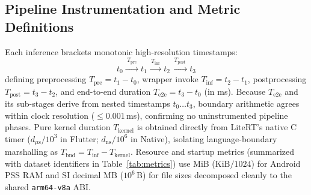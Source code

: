 \subsection{Pipeline Instrumentation and Metric Definitions}
Each inference brackets monotonic high-resolution timestamps:
\begin{equation}
t_0 \xrightarrow{\;T_{\mathrm{pre}}\;} t_1 \xrightarrow{\;T_{\mathrm{inf}}\;} t_2 \xrightarrow{\;T_{\mathrm{post}}\;} t_3
\end{equation}
defining preprocessing $T_{\mathrm{pre}} = t_1 - t_0$, wrapper invoke $T_{\mathrm{inf}} = t_2 - t_1$, postprocessing $T_{\mathrm{post}} = t_3 - t_2$, and end-to-end duration $T_{\mathrm{e2e}} = t_3 - t_0$ (in ms). Because $T_{\mathrm{e2e}}$ and its sub-stages derive from nested timestamps $t_0 \dots t_3$, boundary arithmetic agrees within clock resolution ($\le 0.001$\,ms), confirming no uninstrumented pipeline phases. Pure kernel duration $T_{\mathrm{kernel}}$ is obtained directly from LiteRT's native C timer ($d_{\mu\mathrm{s}}/10^3$ in Flutter; $d_{\mathrm{ns}}/10^6$ in Native), isolating language-boundary marshalling as $T_{\mathrm{bnd}} = T_{\mathrm{inf}} - T_{\mathrm{kernel}}$. Resource and startup metrics (summarized with dataset identifiers in Table~\ref{tab:metrics}) use MiB ($\text{KiB}/1024$) for Android PSS RAM and SI decimal MB ($10^6$\,B) for file sizes decomposed cleanly to the shared \texttt{arm64-v8a} ABI.

